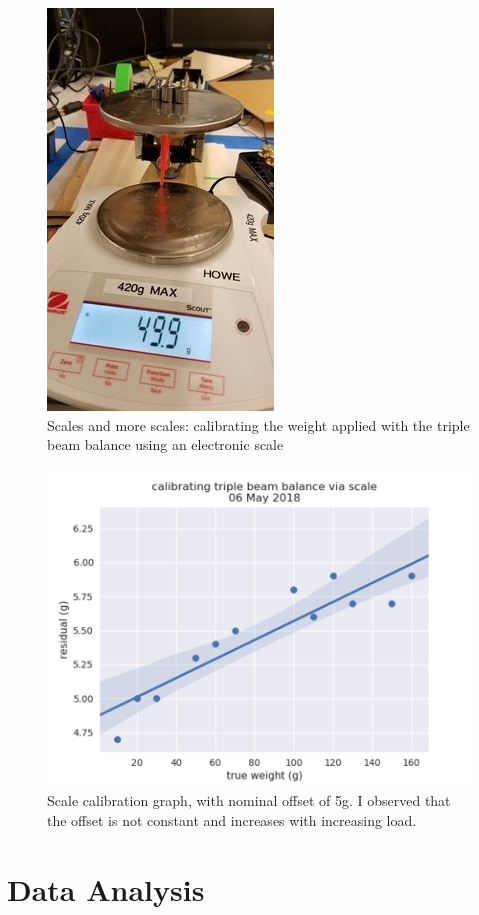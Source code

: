 \documentclass[preprint,12pt,3p]{elsarticle}
\begin{document}
\begin{figure}[H]
\centering
\includegraphics[width=.1\textheight]{images/setup/scale_calibration.jpg}
\caption{Scales and more scales: calibrating the weight applied with the triple beam balance using an electronic scale }
\end{figure}


\begin{figure}[H]
\centering
\includegraphics[width=.6\textwidth]{images/setup/scale_calibration_graph.png}
\caption{Scale calibration graph, with nominal offset of 5g. I observed that the offset is not
constant and increases with increasing load.}
\end{figure}



\section{Data Analysis}\label{sec:analisedosdados}
\end{document}
